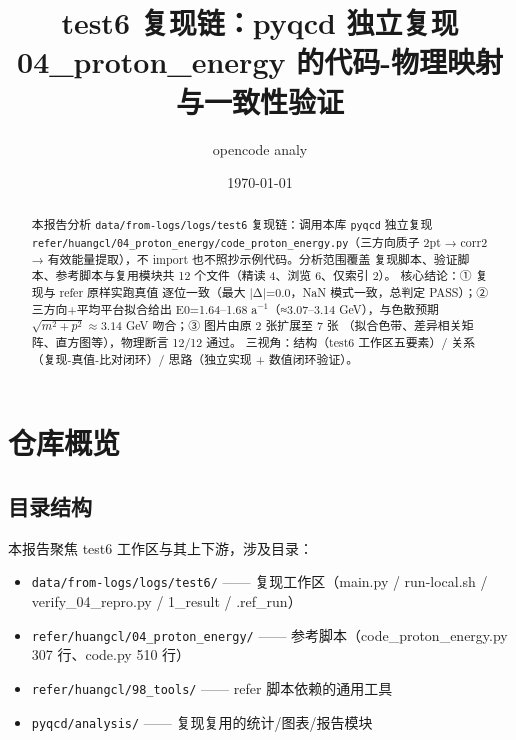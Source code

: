\documentclass[UTF8]{ctexart}
\title{test6 复现链：pyqcd 独立复现 04\_proton\_energy 的代码-物理映射与一致性验证}
\author{opencode analy}
\date{\today}
\begin{document}
\maketitle

\begin{abstract}
本报告分析 \texttt{data/from-logs/logs/test6} 复现链：调用本库 \texttt{pyqcd} 独立复现
\texttt{refer/huangcl/04\_proton\_energy/code\_proton\_energy.py}（三方向质子
2pt → corr2 → 有效能量提取），不 import 也不照抄示例代码。分析范围覆盖
复现脚本、验证脚本、参考脚本与复用模块共 12 个文件（精读 4、浏览 6、仅索引 2）。
核心结论：① 复现与 refer 原样实跑真值 \textcolor{evidence}{逐位一致}（最大
|Δ|=0.0，NaN 模式一致，总判定 PASS）；② 三方向+平均平台拟合给出
E0=1.64--1.68 a$^{-1}$（≈3.07--3.14 GeV），与色散预期
$\sqrt{m^2+p^2}\approx3.14$ GeV 吻合；③ 图片由原 2 张扩展至 7 张
（拟合色带、差异相关矩阵、直方图等），物理断言 12/12 通过。
三视角：结构（test6 工作区五要素）/ 关系（复现-真值-比对闭环）/
思路（独立实现 + 数值闭环验证）。
\end{abstract}

\tableofcontents

\section{仓库概览}
\subsection{目录结构}
本报告聚焦 \textcolor{struct}{test6 工作区}与其上下游，涉及目录：
\begin{itemize}
  \item \texttt{data/from-logs/logs/test6/} —— 复现工作区（main.py / run-local.sh / verify\_04\_repro.py / 1\_result / .ref\_run）
  \item \texttt{refer/huangcl/04\_proton\_energy/} —— 参考脚本（code\_proton\_energy.py 307 行、code.py 510 行）
  \item \texttt{refer/huangcl/98\_tools/} —— refer 脚本依赖的通用工具
  \item \texttt{pyqcd/analysis/} —— 复现复用的统计/图表/报告模块
\end{itemize}
\end{document}

